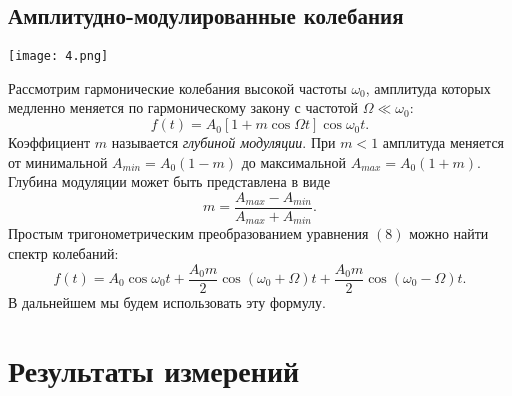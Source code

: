 \documentclass[a4paper,11pt]{extarticle}
\begin{document}
\subsection*{Амплитудно-модулированные колебания}
\begin{center}
\texttt{[image: 4.png]}
\end{center}
Рассмотрим гармонические колебания высокой частоты $\omega_0$, амплитуда которых медленно меняется по гармоническому закону с частотой $\Omega \ll \omega_0$:
\begin{equation}
f(t) = A_0 \left[1+m\cos \Omega t\right] \cos \omega_0 t.
\end{equation}
Коэффициент $m$ называется \textit{глубиной модуляции}. При $m < 1$ амплитуда меняется от минимальной $A_{min} = A_0(1-m)$ до максимальной $A_{max} = A_0(1+m)$. Глубина модуляции может быть представлена в виде
\begin{equation}
m = \dfrac{A_{max}-A_{min}}{A_{max}+A_{min}}.
\end{equation}
Простым тригонометрическим преобразованием уравнения $(8)$ можно найти спектр колебаний:
\begin{equation}
f(t) = A_0 \cos \omega_0t + \dfrac{A_0m}{2} \cos \left(\omega_0 + \Omega\right)t + \dfrac{A_0m}{2}\cos\left(\omega_0 - \Omega\right)t.
\end{equation}
\n
В дальнейшем мы будем использовать эту формулу.

\section*{Результаты измерений}
\end{document}
